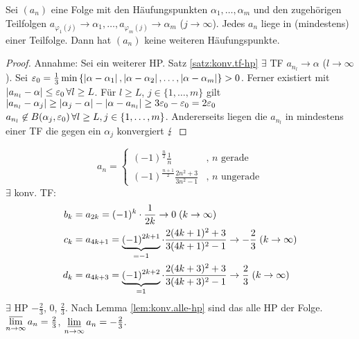 \documentclass[12pt]{scrreprt}
\begin{document}
\begin{lem}
  \label{lem:konv.alle-hp}
  Sei $(a_n)$ eine Folge mit den Häufungspunkten $\alpha_1,\dotsc,\alpha_m$ und den
  zugehörigen Teilfolgen
  $a_{\varphi_1(j)}\to\alpha_1,\dotsc,a_{\varphi_m(j)}\to\alpha_m$
  ($j\to\infty$). Jedes $a_n$ liege in (mindestens) einer Teilfolge. Dann hat
  $(a_n)$ keine weiteren Häufungspunkte.
\end{lem}
\begin{proof}
  Annahme: Sei \kmplx{\alpha} ein weiterer HP. Satz
  \ref{satz:konv.tf-hp} \folgt $\exists$ TF $a_{n_l}\to\alpha$
  ($l\to\infty$). Sei $\varepsilon_0 = \frac13 \min{\{\left\lvert\alpha-\alpha_1\right\lvert,
    \left\lvert\alpha-\alpha_2\right\lvert, \dotsc, \left\lvert\alpha-\alpha_m\right\lvert\}} >
  0$. Ferner existiert  mit
  $\left\lvert a_{n_l}-\alpha\right\lvert\le\varepsilon_0\,\forall l\ge L$. \folgt Für $l\ge L$,
  $j\in\{1,\dotsc,m\}$ gilt $\left\lvert a_{n_l}-\alpha_j\right\lvert \ge
  \left\lvert\alpha_j-\alpha\right\lvert-\left\lvert\alpha-a_{n_l}\right\lvert \ge 3\varepsilon_0-\varepsilon_0 =
  2\varepsilon_0$ \folgt $a_{n_l} \not\in B(\alpha_j, \varepsilon_0)\,\forall l\ge L,
  j\in\{1,\dotsc,m\}$. Andererseits liegen die $a_{n_l}$ in mindestens
  einer TF die gegen ein $\alpha_j$ konvergiert \folgt $\lightning$
\end{proof}

\begin{bsp}
  \label{bsp:konv.bw}
  \[a_n = \begin{cases}
    \displaystyle\left(-1\right)^{\frac{n}{2}}\frac1n &\text{, } n \text{ gerade} \\
    \displaystyle\left(-1\right)^{\frac{n+1}{2}}\frac{2n^2+3}{3n^2-1} &\text{, } n
    \text{ ungerade} \end{cases} \] $\exists$ konv. TF:
  \begin{align*}
    b_k &= a_{2k} = (-1)^k \cdot \frac{1}{2k} \to 0 \; (k\rightarrow\infty) \\
    c_k &= a_{4k+1} = \underbrace{(-1)^{2k+1}}_{=-1} \cdot \frac{2(4k+1)^2+3}{3(4k+1)^2-1} \to -\frac23 \; (k\rightarrow\infty) \\
    d_k &= a_{4k+3} = \underbrace{(-1)^{2k+2}}_{=1} \cdot
    \frac{2(4k+3)^2+3}{3(4k+3)^2-1} \to \frac23 \; (k\rightarrow\infty)
  \end{align*}
  \folgt $\exists$ HP $-\frac23$, $0$, $\frac23$. Nach Lemma \ref{lem:konv.alle-hp} sind das alle HP der Folge.\\
  \folgtnach{\ref{thm:konv.bw}} $\varlimsup\limits_{n\rightarrow\infty}{a_n}=\frac23$,
  $\varliminf\limits_{n\rightarrow\infty}{a_n}=-\frac23$.
\end{bsp}
\end{document}
